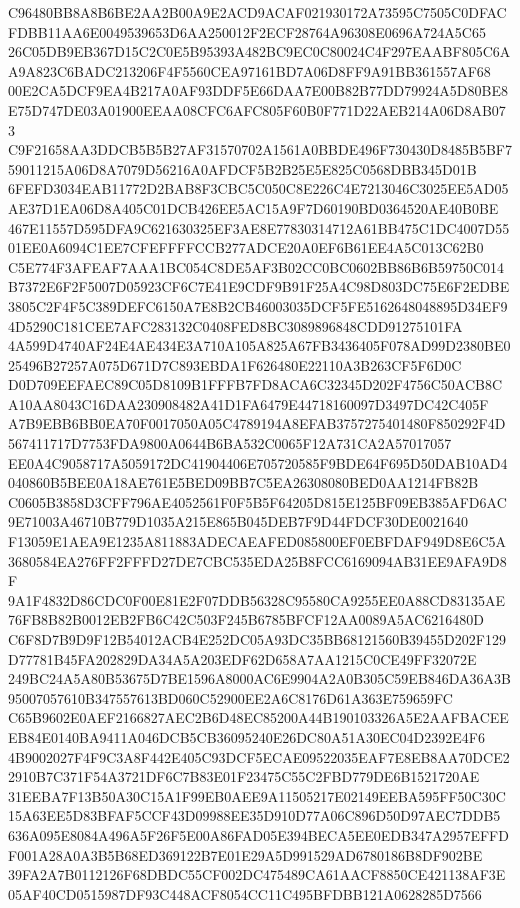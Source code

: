 \documentclass[UTF8,fontset=fandol,zihao=-4,a4paper]{ctexart}
\begin{document}
{{C96480BB8A8B6BE2AA2B00A9E2ACD9ACAF021930172A73595C7505C0DFACFDBB11AA6E0049539653D6AA250012F2ECF28764A96308E0696A724A5C65
26C05DB9EB367D15C2C0E5B95393A482BC9EC0C80024C4F297EAABF805C6AA9A823C6BADC213206F4F5560CEA97161BD7A06D8FF9A91BB361557AF68
00E2CA5DCF9EA4B217A0AF93DDF5E66DAA7E00B82B77DD79924A5D80BE8E75D747DE03A01900EEAA08CFC6AFC805F60B0F771D22AEB214A06D8AB073
C9F21658AA3DDCB5B5B27AF31570702A1561A0BBDE496F730430D8485B5BF759011215A06D8A7079D56216A0AFDCF5B2B25E5E825C0568DBB345D01B
6FEFD3034EAB11772D2BAB8F3CBC5C050C8E226C4E7213046C3025EE5AD05AE37D1EA06D8A405C01DCB426EE5AC15A9F7D60190BD0364520AE40B0BE
467E11557D595DFA9C621630325EF3AE8E77830314712A61BB475C1DC4007D5501EE0A6094C1EE7CFEFFFFCCB277ADCE20A0EF6B61EE4A5C013C62B0
C5E774F3AFEAF7AAA1BC054C8DE5AF3B02CC0BC0602BB86B6B59750C014B7372E6F2F5007D05923CF6C7E41E9CDF9B91F25A4C98D803DC75E6F2EDBE
3805C2F4F5C389DEFC6150A7E8B2CB46003035DCF5FE5162648048895D34EF94D5290C181CEE7AFC283132C0408FED8BC3089896848CDD91275101FA
4A599D4740AF24E4AE434E3A710A105A825A67FB3436405F078AD99D2380BE025496B27257A075D671D7C893EBDA1F626480E22110A3B263CF5F6D0C
D0D709EEFAEC89C05D8109B1FFFB7FD8ACA6C32345D202F4756C50ACB8CA10AA8043C16DAA230908482A41D1FA6479E44718160097D3497DC42C405F
A7B9EBB6BB0EA70F0017050A05C4789194A8EFAB3757275401480F850292F4D567411717D7753FDA9800A0644B6BA532C0065F12A731CA2A57017057
EE0A4C9058717A5059172DC41904406E705720585F9BDE64F695D50DAB10AD4040860B5BEE0A18AE761E5BED09BB7C5EA26308080BED0AA1214FB82B
C0605B3858D3CFF796AE4052561F0F5B5F64205D815E125BF09EB385AFD6AC9E71003A46710B779D1035A215E865B045DEB7F9D44FDCF30DE0021640
F13059E1AEA9E1235A811883ADECAEAFED085800EF0EBFDAF949D8E6C5A3680584EA276FF2FFFD27DE7CBC535EDA25B8FCC6169094AB31EE9AFA9D8F
9A1F4832D86CDC0F00E81E2F07DDB56328C95580CA9255EE0A88CD83135AE76FB8B82B0012EB2FB6C42C503F245B6785BFCF12AA0089A5AC6216480D
C6F8D7B9D9F12B54012ACB4E252DC05A93DC35BB68121560B39455D202F129D77781B45FA202829DA34A5A203EDF62D658A7AA1215C0CE49FF32072E
249BC24A5A80B53675D7BE1596A8000AC6E9904A2A0B305C59EB846DA36A3B95007057610B347557613BD060C52900EE2A6C8176D61A363E759659FC
C65B9602E0AEF2166827AEC2B6D48EC85200A44B190103326A5E2AAFBACEEEB84E0140BA9411A046DCB5CB36095240E26DC80A51A30EC04D2392E4F6
4B9002027F4F9C3A8F442E405C93DCF5ECAE09522035EAF7E8EB8AA70DCE22910B7C371F54A3721DF6C7B83E01F23475C55C2FBD779DE6B1521720AE
31EEBA7F13B50A30C15A1F99EB0AEE9A11505217E02149EEBA595FF50C30C15A63EE5D83BFAF5CCF43D09988EE35D910D77A06C896D50D97AEC7DDB5
636A095E8084A496A5F26F5E00A86FAD05E394BECA5EE0EDB347A2957EFFDF001A28A0A3B5B68ED369122B7E01E29A5D991529AD6780186B8DF902BE
39FA2A7B0112126F68DBDC55CF002DC475489CA61AACF8850CE421138AF3E05AF40CD0515987DF93C448ACF8054CC11C495BFDBB121A0628285D7566
}}
\end{document}
